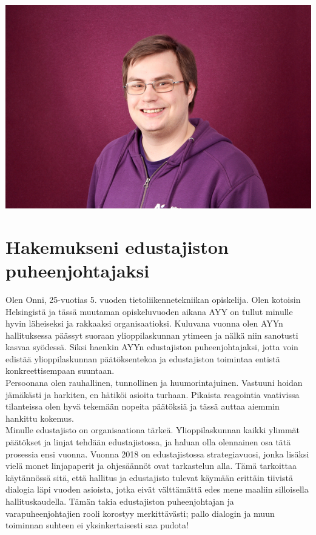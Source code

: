 \documentclass[a4paper, 12pt, finnish]{report}
\newcommand{\topic}{Hakemukseni edustajiston puheenjohtajaksi}
\begin{document}
\includegraphics{onnilampi_ayy.jpg}
\section*{\topic}

Olen Onni, 25-vuotias 5. vuoden tietoliikennetekniikan opiskelija.
Olen kotoisin Helsingistä ja tässä muutaman opiskeluvuoden aikana AYY on tullut minulle hyvin läheiseksi ja rakkaaksi organisaatioksi.
Kuluvana vuonna olen AYYn hallituksessa päässyt suoraan ylioppilaskunnan ytimeen ja nälkä niin sanotusti kasvaa syödessä.
Siksi haenkin AYYn edustajiston puheenjohtajaksi, jotta voin edistää ylioppilaskunnan päätöksentekoa ja edustajiston toimintaa entistä konkreettisempaan suuntaan.\\

Persoonana olen rauhallinen, tunnollinen ja huumorintajuinen.
Vastuuni hoidan jämäkästi ja harkiten, en hätiköi asioita turhaan.
Pikaista reagointia vaativissa tilanteissa olen hyvä tekemään nopeita päätöksiä ja tässä auttaa aiemmin hankittu kokemus.\\

Minulle edustajisto on organisaationa tärkeä.
Ylioppilaskunnan kaikki ylimmät päätökset ja linjat tehdään edustajistossa, ja haluan olla olennainen osa tätä prosessia ensi vuonna.
Vuonna 2018 on edustajistossa strategiavuosi, jonka lisäksi vielä monet linjapaperit ja ohjesäännöt ovat tarkastelun alla.
Tämä tarkoittaa käytännössä sitä, että hallitus ja edustajisto tulevat käymään erittäin tiivistä dialogia läpi vuoden asioista, jotka eivät välttämättä edes mene maaliin silloisella hallituskaudella.
Tämän takia edustajiston puheenjohtajan ja varapuheenjohtajien rooli korostyy merkittävästi; pallo dialogin ja muun toiminnan suhteen ei yksinkertaisesti saa pudota!
 \\
\end{document}
